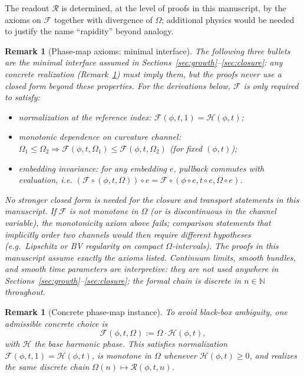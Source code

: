 \documentclass[11pt]{amsart}
\newtheorem{remark}[theorem]{Remark}
\begin{document}
The readout \(\mathcal R\) is determined, at the level of proofs in this manuscript, by the axioms on \(\mathcal F\) together with divergence of \(\Omega\); additional physics would be needed to justify the name ``rapidity'' beyond analogy.

\begin{remark}[Phase-map axioms: minimal interface]
\label{rem:phase-map-interface}
The following three bullets are the \emph{minimal interface} assumed in Sections~\ref{sec:growth}--\ref{sec:closure}: any concrete realization (Remark~\ref{rem:phase-map-concrete}) must imply them, but the proofs never use a closed form beyond these properties.
For the derivations below, $\mathcal F$ is only required to satisfy:
\begin{itemize}
  \item normalization at the reference index: $\mathcal F(\phi,t,1)=\mathcal H(\phi,t)$;
  \item monotonic dependence on curvature channel: $\Omega_1\le \Omega_2 \Rightarrow \mathcal F(\phi,t,\Omega_1)\le \mathcal F(\phi,t,\Omega_2)$ (for fixed $(\phi,t)$);
  \item embedding invariance: for any embedding $e$, pullback commutes with evaluation, i.e. $(\mathcal F\circ(\phi,t,\Omega))\circ e=\mathcal F\circ(\phi\circ e,t\circ e,\Omega\circ e)$.
\end{itemize}
No stronger closed form is needed for the closure and transport statements in this manuscript.
If \(\mathcal F\) is not monotone in \(\Omega\) (or is discontinuous in the channel variable), the monotonicity axiom above fails; comparison statements that implicitly order two channels would then require different hypotheses (e.g.\ Lipschitz or BV regularity on compact \(\Omega\)-intervals). The proofs in this manuscript assume exactly the axioms listed.
Continuum limits, smooth bundles, and smooth time parameters are \emph{interpretive}: they are not used anywhere in Sections~\ref{sec:growth}--\ref{sec:closure}; the formal chain is discrete in \(n\in\mathbb N\) throughout.
\end{remark}

\begin{remark}[Concrete phase-map instance]
\label{rem:phase-map-concrete}
To avoid black-box ambiguity, one admissible concrete choice is
\[
\mathcal F(\phi,t,\Omega):=\Omega\cdot \mathcal H(\phi,t),
\]
with \(\mathcal H\) the base harmonic phase. This satisfies normalization
\(\mathcal F(\phi,t,1)=\mathcal H(\phi,t)\), is monotone in \(\Omega\) whenever
\(\mathcal H(\phi,t)\ge 0\), and realizes the same discrete chain
\(\Omega(n)\mapsto \mathcal R(\phi,t,n)\).
\end{remark}
\end{document}
